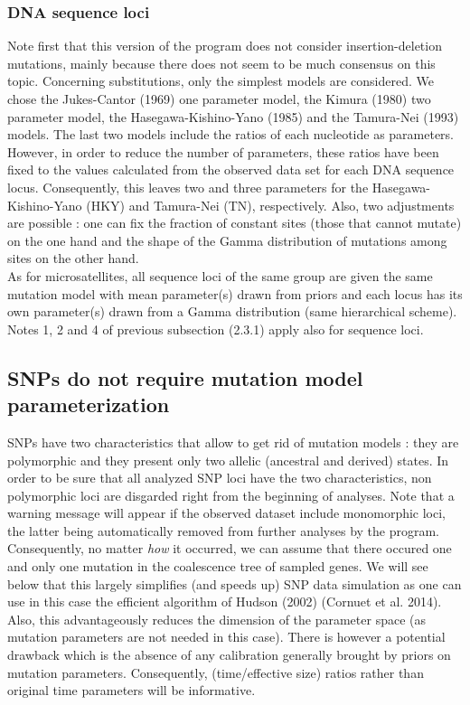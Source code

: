 \subsubsection{DNA sequence loci}

Note first that this version of the program does not consider insertion-deletion
mutations, mainly because there does not seem to be much consensus
on this topic. Concerning substitutions, only the simplest models
are considered. We chose the Jukes-Cantor (1969) one parameter model,
the Kimura (1980) two parameter model, the Hasegawa-Kishino-Yano (1985)
and the Tamura-Nei (1993) models. The last two models include the
ratios of each nucleotide as parameters. However, in order to reduce
the number of parameters, these ratios have been fixed to the values
calculated from the observed data set for each DNA sequence locus.
Consequently, this leaves two and three parameters for the Hasegawa-Kishino-Yano
(HKY) and Tamura-Nei (TN), respectively. Also, two adjustments are
possible : one can fix the fraction of constant sites (those that
cannot mutate) on the one hand and the shape of the Gamma distribution
of mutations among sites on the other hand.\\
 As for microsatellites, all sequence loci of the same group are given
the same mutation model with mean parameter(s) drawn from priors and
each locus has its own parameter(s) drawn from a Gamma distribution
(same hierarchical scheme). Notes 1, 2 and 4 of previous subsection
(2.3.1) apply also for sequence loci.


\subsection{SNPs do not require mutation model parameterization}

SNPs have two characteristics that allow to get rid of mutation models
: they are polymorphic and they present only two allelic (ancestral
and derived) states. In order to be sure that all analyzed SNP loci
have the two characteristics, non polymorphic loci are disgarded right
from the beginning of analyses. Note that a warning message will appear
if the observed dataset include monomorphic loci, the latter being
automatically removed from further analyses by the program. Consequently,
no matter \emph{how} it occurred, we can assume that there occured
one and only one mutation in the coalescence tree of sampled genes.
We will see below that this largely simplifies (and speeds up) SNP
data simulation as one can use in this case the efficient algorithm
of Hudson (2002) (Cornuet et al. 2014). Also, this advantageously
reduces the dimension of the parameter space (as mutation parameters
are not needed in this case). There is however a potential drawback
which is the absence of any calibration generally brought by priors
on mutation parameters. Consequently, (time/effective size) ratios
rather than original time parameters will be informative.

